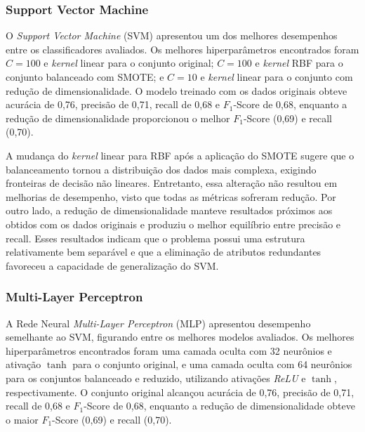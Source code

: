 \subsubsection{Support Vector Machine}
O \textit{Support Vector Machine} (SVM) apresentou um dos melhores desempenhos entre os classificadores avaliados. Os melhores hiperparâmetros encontrados foram $C=100$ e \textit{kernel} linear para o conjunto original; $C=100$ e \textit{kernel} RBF para o conjunto balanceado com SMOTE; e $C=10$ e \textit{kernel} linear para o conjunto com redução de dimensionalidade. O modelo treinado com os dados originais obteve acurácia de 0,76, precisão de 0,71, recall de 0,68 e $F_1$-Score de 0,68, enquanto a redução de dimensionalidade proporcionou o melhor $F_1$-Score (0,69) e recall (0,70).

A mudança do \textit{kernel} linear para RBF após a aplicação do SMOTE sugere que o balanceamento tornou a distribuição dos dados mais complexa, exigindo fronteiras de decisão não lineares. Entretanto, essa alteração não resultou em melhorias de desempenho, visto que todas as métricas sofreram redução. Por outro lado, a redução de dimensionalidade manteve resultados próximos aos obtidos com os dados originais e produziu o melhor equilíbrio entre precisão e recall. Esses resultados indicam que o problema possui uma estrutura relativamente bem separável e que a eliminação de atributos redundantes favoreceu a capacidade de generalização do SVM.

\subsubsection{Multi-Layer Perceptron}
A Rede Neural \textit{Multi-Layer Perceptron} (MLP) apresentou desempenho semelhante ao SVM, figurando entre os melhores modelos avaliados. Os melhores hiperparâmetros encontrados foram uma camada oculta com 32 neurônios e ativação $\tanh$ para o conjunto original, e uma camada oculta com 64 neurônios para os conjuntos balanceado e reduzido, utilizando ativações \textit{ReLU} e $\tanh$, respectivamente. O conjunto original alcançou acurácia de 0,76, precisão de 0,71, recall de 0,68 e $F_1$-Score de 0,68, enquanto a redução de dimensionalidade obteve o maior $F_1$-Score (0,69) e recall (0,70).

